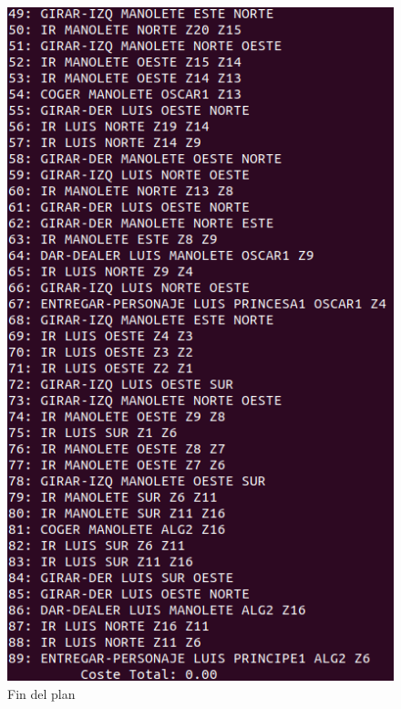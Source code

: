 \begin{figure}[H]
\begin{minipage}[b]{0.5\linewidth}
		\includegraphics[width=\linewidth]{ej7-2.png}
		\caption{Fin del plan}
		\label{fig:ej7-2}
	\end{minipage}
\end{figure}


